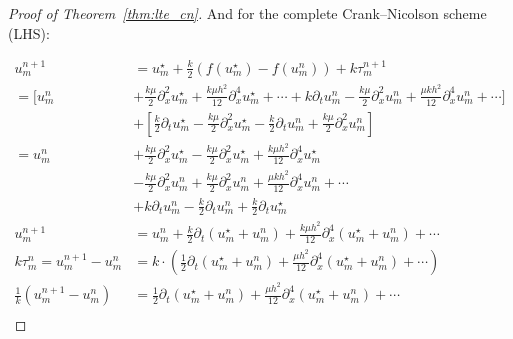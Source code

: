 \begin{proof}[Proof of Theorem~\ref{thm:lte_cn}]
  And for the complete Crank--Nicolson scheme (LHS):

  \begin{align*}
    u_m^{n+1}                                 & = u_m^\star + \tfrac{k}{2}\left(f(u_m^\star) - f(u_m^n)\right) + k\tau_m^{n+1}                                                                                                                                  \\
    = \bigl[u_m^n                             & +\tfrac{k \mu}{2}\partial_x^2 u_m^\star + \tfrac{k \mu h^2}{12}\partial_x^4 u_m^\star + \cdots + k\partial_t u_m^n - \tfrac{k\mu}{2}\partial_x^2 u_m^n + \tfrac{\mu k h^2}{12}\partial_x^4 u_m^n + \cdots\bigr] \\
                                              & + \left[\tfrac{k}{2}\partial_t u_m^\star - \tfrac{k\mu}{2}\partial_x^2 u_m^\star - \tfrac{k}{2}\partial_t u_m^n + \tfrac{k\mu}{2}\partial_x^2 u_m^n\right]                                                      \\
    = u_m^n                                   & +\tfrac{k \mu}{2}\partial_x^2 u_m^\star -  \tfrac{k\mu}{2}\partial_x^2 u_m^\star +\tfrac{k \mu h^2}{12}\partial_x^4 u_m^\star                                                                                   \\
                                              & - \tfrac{k\mu}{2}\partial_x^2 u_m^n +  \tfrac{k\mu}{2}\partial_x^2 u_m^n +  \tfrac{\mu k h^2}{12}\partial_x^4 u_m^n + \cdots                                                                                    \\
                                              & + k\partial_t u_m^n - \tfrac{k}{2}\partial_t u_m^n + \tfrac{k}{2}\partial_t u_m^\star                                                                                                                           \\
    u_m^{n+1}                                 & = u_m^n + \tfrac{k}{2}\partial_t\left(u_m^\star + u_m^n\right) + \tfrac{k \mu h^2}{12}\partial_x^4 \left(u_m^\star + u_m^n\right) + \cdots                                                                      \\
    k\tau_m^n = u_m^{n+1} - u_m^n             & = k\cdot\left(\tfrac{1}{2}\partial_t\left(u_m^\star + u_m^n\right) + \tfrac{\mu h^2}{12}\partial_x^4 \left(u_m^\star + u_m^n\right) + \cdots\right)                                                             \\
    \frac{1}{k}\left(u_m^{n+1} - u_m^n\right) & = \tfrac{1}{2}\partial_t\left(u_m^\star + u_m^n\right) + \tfrac{\mu h^2}{12}\partial_x^4 \left(u_m^\star + u_m^n\right) + \cdots                                                                                \\

\end{align*}
\end{proof}
